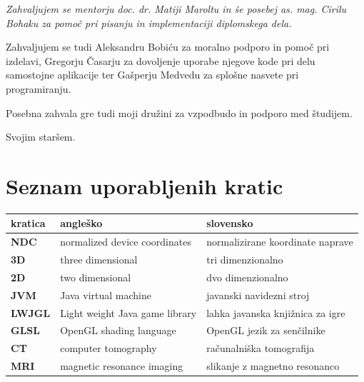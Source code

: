 \documentclass[a4paper, 12pt]{book}
\newcommand{\clearemptydoublepage}{\newpage{\pagestyle{empty}\cleardoublepage}}
\begin{document}
\thispagestyle{empty}\mbox{}\vfill\null\it%
Zahvaljujem se mentorju doc. dr. Matiji Maroltu in še posebej as. mag. Cirilu Bohaku za pomoč pri pisanju in implementaciji diplomskega dela. 

Zahvaljujem se tudi Aleksandru Bobiću za moralno podporo in pomoč pri izdelavi, Gregorju Časarju za dovoljenje uporabe njegove kode pri delu samostojne aplikacije ter Gašperju Medvedu za splošne nasvete pri programiranju.

Posebna zahvala gre tudi moji družini za vzpodbudo in podporo med študijem.
\rm\normalfont

\clearemptydoublepage

\thispagestyle{empty}\mbox{}{\textheight}\mbox{}\hfill\begin{minipage}{0.55\textwidth}%
\normalfont\end{minipage}
Svojim staršem.
\clearemptydoublepage

\def\thepage{}%
\tableofcontents{}


\clearemptydoublepage


\chapter*{Seznam uporabljenih kratic}

\begin{tabular}{l|l|l}
  {\bf kratica} & {\bf angleško} & {\bf slovensko} \\ \hline
  {\bf NDC} & normalized device coordinates & normalizirane koordinate naprave \\
  {\bf 3D} & three dimensional & tri dimenzionalno \\
  {\bf 2D} & two dimensional & dvo dimenzionalno \\
  {\bf JVM} & Java virtual machine & javanski navidezni stroj \\
  {\bf LWJGL} & Light weight Java game library & lahka javanska knjižnica za igre \\
  {\bf GLSL} & OpenGL shading language & OpenGL jezik za senčilnike \\
  {\bf CT} & computer tomography & računalniška tomografija \\
  {\bf MRI} & magnetic resonance imaging & slikanje z magnetno resonanco\\
\end{tabular}
\end{document}
